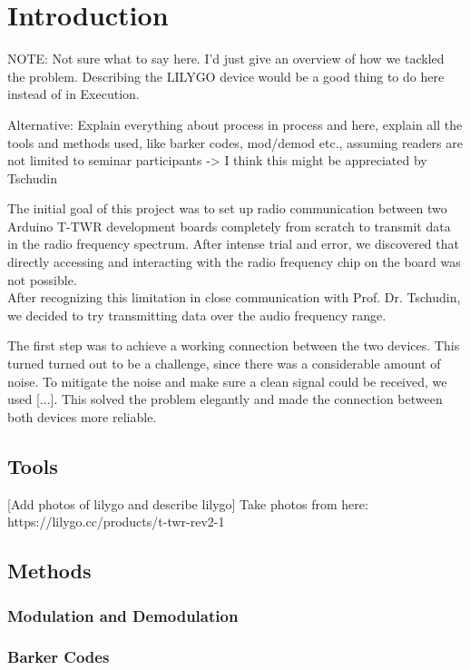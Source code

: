 \chapter{Introduction}
{NOTE: Not sure what to say here. I'd just give an overview of how we tackled the problem.
Describing the LILYGO device would be a good thing to do here instead of in Execution.

Alternative:
Explain everything about process in process and here, explain all the tools and methods used, like barker codes, mod/demod etc., assuming readers are not limited to seminar participants -> I think this might be appreciated by Tschudin}





The initial goal of this project was to set up radio communication between two Arduino T-TWR development boards completely from scratch to transmit data in the radio frequency spectrum. After intense trial and error, we discovered that directly accessing and interacting with the radio frequency chip on the board was not possible.\\

After recognizing this limitation in close communication with Prof. Dr. Tschudin, we decided to try transmitting data over the audio frequency range.

The first step was to achieve a working connection between the two devices. This turned turned out to be a challenge, since there was a considerable amount of noise. To mitigate the noise and make sure a clean signal could be received, we used [...]. This solved the problem elegantly and made the connection between both devices more reliable.

\section{Tools}
[Add photos of lilygo and describe lilygo]
Take photos from here: https://lilygo.cc/products/t-twr-rev2-1


\section{Methods}
\subsection{Modulation and Demodulation}
\subsection{Barker Codes}
